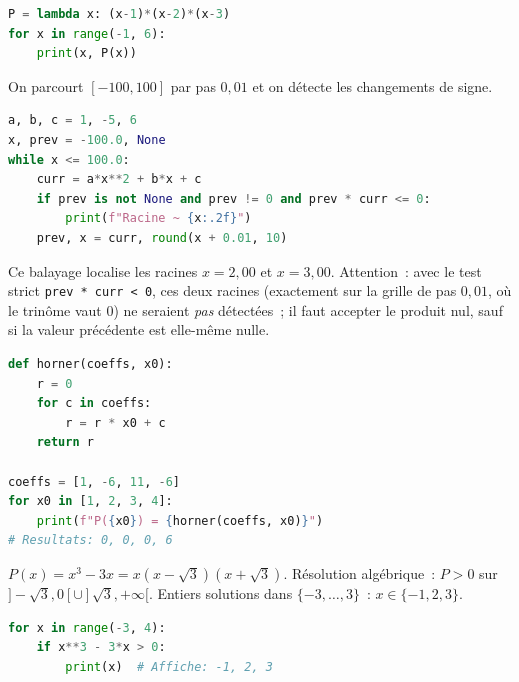 \begin{lstlisting}[language=Python]
P = lambda x: (x-1)*(x-2)*(x-3)
for x in range(-1, 6):
    print(x, P(x))
\end{lstlisting}


On parcourt $[-100,100]$ par pas $0{,}01$ et on d\'etecte les changements de signe.

\begin{lstlisting}[language=Python]
a, b, c = 1, -5, 6
x, prev = -100.0, None
while x <= 100.0:
    curr = a*x**2 + b*x + c
    if prev is not None and prev != 0 and prev * curr <= 0:
        print(f"Racine ~ {x:.2f}")
    prev, x = curr, round(x + 0.01, 10)
\end{lstlisting}
Ce balayage localise les racines $x=2{,}00$ et $x=3{,}00$. Attention~: avec le test strict \texttt{prev * curr < 0}, ces deux racines (exactement sur la grille de pas $0{,}01$, o\`u le trin\^ome vaut $0$) ne seraient \emph{pas} d\'etect\'ees~; il faut accepter le produit nul, sauf si la valeur pr\'ec\'edente est elle-m\^eme nulle.


\begin{lstlisting}[language=Python]
def horner(coeffs, x0):
    r = 0
    for c in coeffs:
        r = r * x0 + c
    return r

coeffs = [1, -6, 11, -6]
for x0 in [1, 2, 3, 4]:
    print(f"P({x0}) = {horner(coeffs, x0)}")
# Resultats: 0, 0, 0, 6
\end{lstlisting}


$P(x)=x^3-3x=x(x-\sqrt{3})(x+\sqrt{3})$. R\'esolution alg\'ebrique~:
$P>0$ sur $]-\sqrt{3},0[\cup]\sqrt{3},+\infty[$.
Entiers solutions dans $\{-3,\ldots,3\}$~: $x\in\{-1,2,3\}$.

\begin{lstlisting}[language=Python]
for x in range(-3, 4):
    if x**3 - 3*x > 0:
        print(x)  # Affiche: -1, 2, 3
\end{lstlisting}

